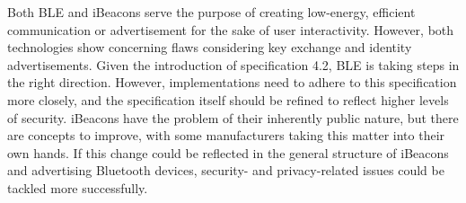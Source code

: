 Both \ac{BLE} and iBeacons serve the purpose of creating low-energy, efficient communication or advertisement for the sake of user interactivity. However, both technologies show concerning flaws considering key exchange and identity advertisements. Given the introduction of specification 4.2, \ac{BLE} is taking steps in the right direction. However, implementations need to adhere to this specification more closely, and the specification itself should be refined to reflect higher levels of security. iBeacons have the problem of their inherently public nature, but there are concepts to improve, with some manufacturers taking this matter into their own hands. If this change could be reflected in the general structure of iBeacons and advertising Bluetooth devices, security- and privacy-related issues could be tackled more successfully.
